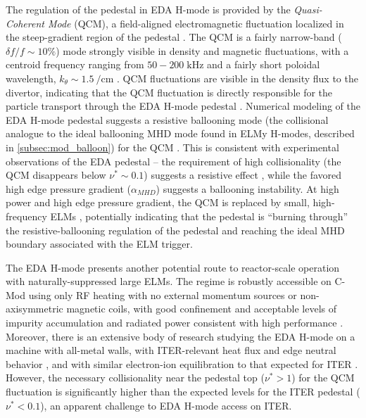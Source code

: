 The regulation of the pedestal in EDA H-mode is provided by the \emph{Quasi-Coherent Mode} (QCM), a field-aligned electromagnetic fluctuation localized in the steep-gradient region of the pedestal \cite{Hubbard2001,Terry2005,Mossessian2003}.  The QCM is a fairly narrow-band ($\delta f/f \sim 10\%$) mode strongly visible in density and magnetic fluctuations, with a centroid frequency ranging from $50-200\;\si{\kilo\hertz}$ and a fairly short poloidal wavelength, $k_\theta \sim \SI{1.5}{\per\centi\meter}$ \cite{Terry2005}.  QCM fluctuations are visible in the density flux to the divertor, indicating that the QCM fluctuation is directly responsible for the particle transport through the EDA H-mode pedestal \cite{Greenwald2007,Terry2005}.  Numerical modeling of the EDA H-mode pedestal suggests a resistive ballooning mode (the collisional analogue to the ideal ballooning MHD mode found in ELMy H-modes, described in \cref{subsec:mod_balloon}) for the QCM \cite{Mazurenko2002,Hughes2007a}.  This is consistent with 
experimental observations of the EDA pedestal -- the requirement of high collisionality (the QCM disappears below $\nu^* \sim 0.1$) suggests a resistive effect \cite{Hughes2013}, while the favored high edge pressure gradient ($\alpha_{MHD}$) suggests a ballooning instability.  At high power and high edge pressure gradient, the QCM is replaced by small, high-frequency ELMs \cite{Mossessian2002,Mossessian2003,Hughes2007a}, potentially indicating that the pedestal is ``burning through'' the resistive-ballooning regulation of the pedestal and reaching the ideal MHD boundary associated with the ELM trigger.

The EDA H-mode presents another potential route to reactor-scale operation with naturally-suppressed large ELMs.  The regime is robustly accessible on C-Mod using only RF heating with no external momentum sources or non-axisymmetric magnetic coils, with good confinement and acceptable levels of impurity accumulation and radiated power consistent with high performance \cite{Hughes2011}.  Moreover, there is an extensive body of research studying the EDA H-mode on a machine with all-metal walls, with ITER-relevant heat flux and edge neutral behavior \cite{Hubbard2007,Greenwald2007}, and with similar electron-ion equilibration to that expected for ITER \cite{McDermott2009a}.  However, the necessary collisionality near the pedestal top ($\nu^* > 1$) for the QCM fluctuation is significantly higher than the expected levels for the ITER pedestal ($\nu^* < 0.1$), an apparent challenge to EDA H-mode access on ITER.\nicesectionending

